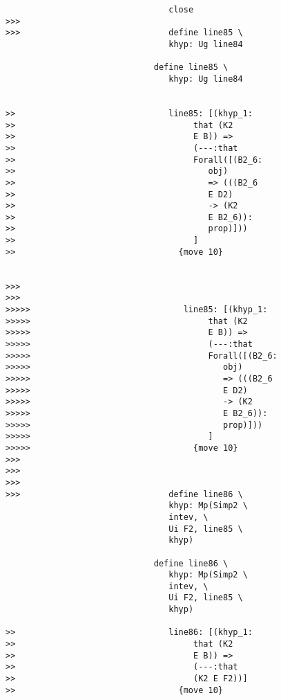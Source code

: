 \documentclass[12pt]{article}
\begin{document}
\begin{verbatim}
                                 close
>>>
>>>                              define line85 \
                                 khyp: Ug line84

                              define line85 \
                                 khyp: Ug line84


>>                               line85: [(khyp_1:
>>                                    that (K2
>>                                    E B)) =>
>>                                    (---:that
>>                                    Forall([(B2_6:
>>                                       obj)
>>                                       => (((B2_6
>>                                       E D2)
>>                                       -> (K2
>>                                       E B2_6)):
>>                                       prop)]))
>>                                    ]
>>                                 {move 10}


>>>
>>>
>>>>>                               line85: [(khyp_1:
>>>>>                                    that (K2
>>>>>                                    E B)) =>
>>>>>                                    (---:that
>>>>>                                    Forall([(B2_6:
>>>>>                                       obj)
>>>>>                                       => (((B2_6
>>>>>                                       E D2)
>>>>>                                       -> (K2
>>>>>                                       E B2_6)):
>>>>>                                       prop)]))
>>>>>                                    ]
>>>>>                                 {move 10}
>>>
>>>
>>>
>>>                              define line86 \
                                 khyp: Mp(Simp2 \
                                 intev, \
                                 Ui F2, line85 \
                                 khyp)

                              define line86 \
                                 khyp: Mp(Simp2 \
                                 intev, \
                                 Ui F2, line85 \
                                 khyp)

>>                               line86: [(khyp_1:
>>                                    that (K2
>>                                    E B)) =>
>>                                    (---:that
>>                                    (K2 E F2))]
>>                                 {move 10}



\end{verbatim}
\end{document}
